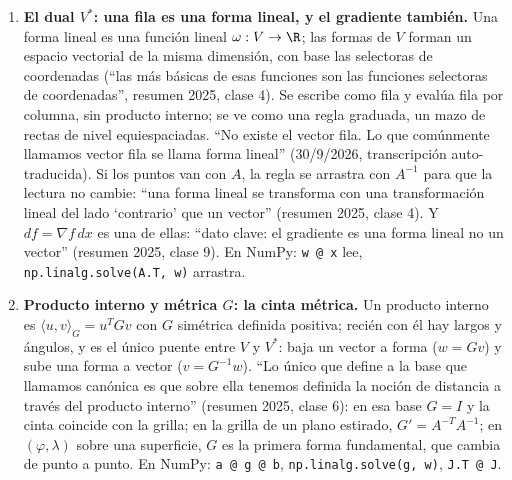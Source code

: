 \begin{enumerate}
  \(O\) y cada mojón pasa a ser \(P-O\), o cuando homogeneizamos \((x,y)\mapsto(x,y,1)\). Toda
  transformación lineal ``conserva el cero'' (19/8/2026), por eso las traslaciones piden
  homogéneas. En el espíritu de lo que dice el profesor sobre los campos vectoriales
  (``tiene sentido pensarlos como puntos'', 14/10/2026, transcripción auto-traducida): en
  esta materia un vector es un mojón visto desde \(O\) o un desplazamiento entre dos. En
  NumPy, punto y desplazamiento son el mismo \texttt{np.array([x, y])}; independencia:
  \texttt{np.linalg.matrix\_rank}.
  \item \textbf{El dual \(V^{*}\): una fila es una forma lineal, y el gradiente también.}
  Una forma lineal es una función lineal \(\omega:V\to\R\); las formas de \(V\) forman un
  espacio vectorial de la misma dimensión, con base las selectoras de coordenadas (``las
  más básicas de esas funciones son las funciones selectoras de coordenadas'', resumen
  2025, clase 4). Se escribe como fila y evalúa fila por columna, sin producto interno; se
  ve como una regla graduada, un mazo de rectas de nivel equiespaciadas. ``No existe el
  vector fila. Lo que comúnmente llamamos vector fila se llama forma lineal''
  (30/9/2026, transcripción auto-traducida). Si los puntos van con \(A\), la regla se
  arrastra con \(A^{-1}\) para que la lectura no cambie: ``una forma lineal se transforma
  con una transformación lineal del lado `contrario' que un vector'' (resumen 2025,
  clase 4). Y \(df=\nabla f\,dx\) es una de ellas: ``dato clave: el gradiente es una forma
  lineal no un vector'' (resumen 2025, clase 9). En NumPy: \texttt{w @ x} lee,
  \texttt{np.linalg.solve(A.T, w)} arrastra.
  \item \textbf{Producto interno y métrica \(G\): la cinta métrica.} Un producto interno
  es \(\langle u,v\rangle_G=u^TGv\) con \(G\) simétrica definida positiva; recién con él
  hay largos y ángulos, y es el único puente entre \(V\) y \(V^{*}\): baja un vector a forma
  (\(w=Gv\)) y sube una forma a vector (\(v=G^{-1}w\)). ``Lo único que define a la base que
  llamamos canónica es que sobre ella tenemos definida la noción de distancia a través del
  producto interno'' (resumen 2025, clase 6): en esa base \(G=I\) y la cinta coincide con la
  grilla; en la grilla de un plano estirado, \(G'=A^{-T}A^{-1}\); en \((\varphi,\lambda)\)
  sobre una superficie, \(G\) es la primera forma fundamental, que cambia de punto a punto.
  En NumPy: \texttt{a @ g @ b}, \texttt{np.linalg.solve(g, w)}, \texttt{J.T @ J}.
\end{enumerate}

